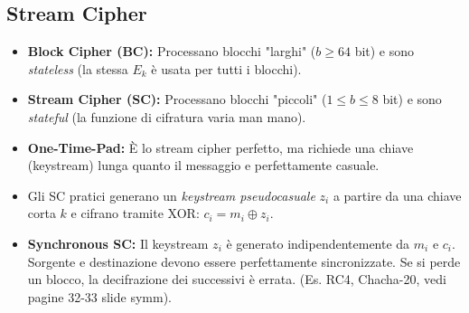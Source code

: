 \documentclass[../main.tex]{subfiles}
\begin{document}
\subsection{Stream Cipher}
\begin{itemize}
	\item \textbf{Block Cipher (BC):} Processano blocchi "larghi" ($b \ge 64$ bit) e sono \emph{stateless} (la stessa $E_k$ è usata per tutti i blocchi).
	\item \textbf{Stream Cipher (SC):} Processano blocchi "piccoli" ($1 \le b \le 8$ bit) e sono \emph{stateful} (la funzione di cifratura varia man mano).
	\item \textbf{One-Time-Pad:} È lo stream cipher perfetto, ma richiede una chiave (keystream) lunga quanto il messaggio e perfettamente casuale.
	\item Gli SC pratici generano un \emph{keystream pseudocasuale} $z_i$ a partire da una chiave corta $k$ e cifrano tramite XOR: $c_i = m_i \oplus z_i$.
	\item \textbf{Synchronous SC:} Il keystream $z_i$ è generato indipendentemente da $m_i$ e $c_i$. Sorgente e destinazione devono essere perfettamente sincronizzate. Se si perde un blocco, la decifrazione dei successivi è errata. (Es. RC4, Chacha-20, vedi pagine 32-33 slide symm).
	         

\end{itemize}
\end{document}
